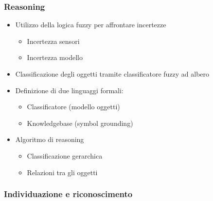 \documentclass[c]{beamer}
\begin{document}

\begin{frame}
\frametitle{Reasoning}

\begin{itemize}
\item Utilizzo della logica fuzzy per affrontare incertezze
 \begin{itemize}
  \item Incertezza sensori
  \item Incertezza modello
 \end{itemize}
\item Classificazione degli oggetti tramite classificatore fuzzy ad albero

\item Definizione di due linguaggi formali:
 \begin{itemize}
  \item Classificatore (modello oggetti)
  \item Knowledgebase (symbol grounding)
 \end{itemize}

\item Algoritmo di reasoning
 \begin{itemize}
  \item Classificazione gerarchica
  \item Relazioni tra gli oggetti
 \end{itemize}
\end{itemize}



\end{frame}


\begin{frame}
\frametitle{Individuazione e riconoscimento}

\end{frame}

\end{document}
